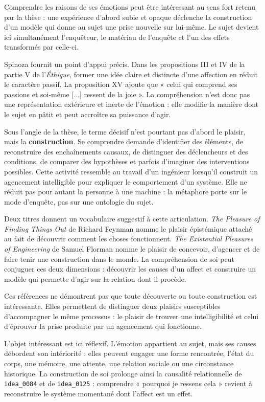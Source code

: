 \documentclass[10pt,a4paper]{article}
\begin{document}
Comprendre les raisons de ses émotions peut être intéressant au sens fort retenu par la thèse : une expérience d'abord subie et opaque déclenche la construction d'un modèle qui donne au sujet une prise nouvelle sur lui-même. Le sujet devient ici simultanément l'enquêteur, le matériau de l'enquête et l'un des effets transformés par celle-ci.

Spinoza fournit un point d'appui précis. Dans les propositions III et IV de la partie V de l'\emph{Éthique}, former une idée claire et distincte d'une affection en réduit le caractère passif. La proposition XV ajoute que « celui qui comprend ses passions et soi-même [...] ressent de la joie ». La compréhension n'est donc pas une représentation extérieure et inerte de l'émotion : elle modifie la manière dont le sujet en pâtit et peut accroître sa puissance d'agir.

Sous l'angle de la thèse, le terme décisif n'est pourtant pas d'abord le plaisir, mais la \textbf{construction}. Se comprendre demande d'identifier des éléments, de reconstruire des enchaînements causaux, de distinguer des déclencheurs et des conditions, de comparer des hypothèses et parfois d'imaginer des interventions possibles. Cette activité ressemble au travail d'un ingénieur lorsqu'il construit un agencement intelligible pour expliquer le comportement d'un système. Elle ne réduit pas pour autant la personne à une machine : la métaphore porte sur le mode d'enquête, pas sur une ontologie du sujet.

Deux titres donnent un vocabulaire suggestif à cette articulation. \emph{The Pleasure of Finding Things Out} de Richard Feynman nomme le plaisir épistémique attaché au fait de découvrir comment les choses fonctionnent. \emph{The Existential Pleasures of Engineering} de Samuel Florman nomme le plaisir de concevoir, d'agencer et de faire tenir une construction dans le monde. La compréhension de soi peut conjuguer ces deux dimensions : découvrir les causes d'un affect et construire un modèle qui permette d'agir sur la relation dont il procède.

Ces références ne démontrent pas que toute découverte ou toute construction est intéressante. Elles permettent de distinguer deux plaisirs susceptibles d'accompagner le même processus : le plaisir de trouver une intelligibilité et celui d'éprouver la prise produite par un agencement qui fonctionne.

L'objet intéressant est ici réflexif. L'émotion appartient au sujet, mais ses causes débordent son intériorité : elles peuvent engager une forme rencontrée, l'état du corps, une mémoire, une attente, une relation sociale ou une circonstance historique. La construction de soi prolonge ainsi la causalité relationnelle de \texttt{idea\_0084} et de \texttt{idea\_0125} : comprendre « pourquoi je ressens cela » revient à reconstruire le système momentané dont l'affect est un effet.
\end{document}
